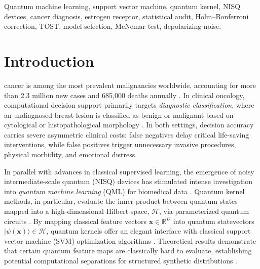 \documentclass[journal,twocolumn]{IEEEtran}
\begin{document}
\begin{IEEEkeywords}
Quantum machine learning, support vector machine, quantum kernel, NISQ devices, cancer diagnosis, estrogen receptor, statistical audit, Holm--Bonferroni correction, TOST, model selection, McNemar test, depolarizing noise.
\end{IEEEkeywords}

\section{Introduction}

 cancer is among the most prevalent malignancies worldwide, accounting for more than 2.3 million new cases and 685,000 deaths annually \cite{globocan2020}. In clinical oncology, computational decision support primarily targets \textit{diagnostic classification}, where an undiagnosed breast lesion is classified as benign or malignant based on cytological or histopathological morphology \cite{bray2018global,mangasarian1995breast}. In both settings, decision accuracy carries severe asymmetric clinical costs: false negatives delay critical life-saving interventions, while false positives trigger unnecessary invasive procedures, physical morbidity, and emotional distress.

In parallel with advances in classical supervised learning, the emergence of noisy intermediate-scale quantum (NISQ) devices \cite{preskill2018quantum} has stimulated intense investigation into \textit{quantum machine learning} (QML) for biomedical data \cite{biamonte2017quantum}. Quantum kernel methods, in particular, evaluate the inner product between quantum states mapped into a high-dimensional Hilbert space, $\mathcal{H}$, via parameterized quantum circuits \cite{havlicek2019supervised,schuld2021supervised}. By mapping classical feature vectors $\mathbf{x} \in \mathbb{R}^D$ into quantum statevectors $|\psi(\mathbf{x})\rangle \in \mathcal{H}$, quantum kernels offer an elegant interface with classical support vector machine (SVM) optimization algorithms \cite{rebentrost2014quantum}. Theoretical results demonstrate that certain quantum feature maps are classically hard to evaluate, establishing potential computational separations for structured synthetic distributions \cite{liu2021rigorous}.
\end{document}
